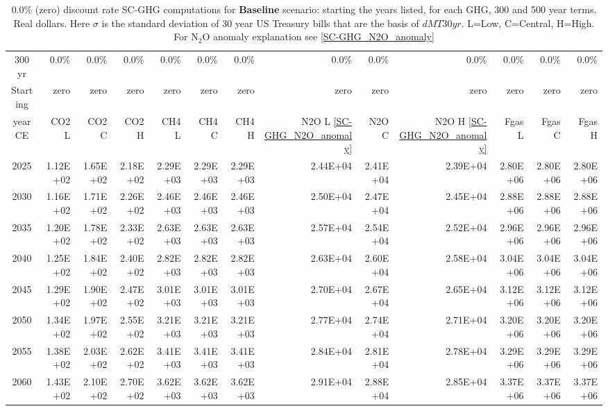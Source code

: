 \documentclass{article}
\begin{document}
\begin{table}
   \caption{0.0\% (zero) discount rate  SC-GHG computations for \textbf{Baseline} scenario: starting the years listed, for each GHG, 300 and 500 year terms. Real dollars. Here $\sigma$ is the standard deviation of 30 year US Treasury bills that are the basis of $dMT30yr$. L=Low, C=Central, H=High. For N$_2$O anomaly explanation see \ref{SC-GHG_N2O_anomaly}} 
\label{PVs_300_yearSCC_B0.0}
\small
\begin{tabular}{crrr|rrr|rrr|rrr}
300 yr   & 0.0\%    & 0.0\%    & 0.0\%    & 0.0\%    & 0.0\%    & 0.0\%    & 0.0\%    & 0.0\%    & 0.0\%    & 0.0\%    & 0.0\%    & 0.0\%    \\
Starting & zero     & zero     & zero     & zero     & zero     & zero     & zero     & zero     & zero     & zero     & zero     & zero     \\
year CE  & CO2 L    & CO2 C    & CO2 H    & CH4 L    & CH4 C    & CH4 H    & N2O L \ref{SC-GHG_N2O_anomaly}     & N2O C      & N2O H \ref{SC-GHG_N2O_anomaly}    & Fgas L   & Fgas C   & Fgas H   \\
2025     & 1.12E+02 & 1.65E+02 & 2.18E+02 & 2.29E+03 & 2.29E+03 & 2.29E+03 & 2.44E+04 & 2.41E+04 & 2.39E+04 & 2.80E+06 & 2.80E+06 & 2.80E+06 \\
2030     & 1.16E+02 & 1.71E+02 & 2.26E+02 & 2.46E+03 & 2.46E+03 & 2.46E+03 & 2.50E+04 & 2.47E+04 & 2.45E+04 & 2.88E+06 & 2.88E+06 & 2.88E+06 \\
2035     & 1.20E+02 & 1.78E+02 & 2.33E+02 & 2.63E+03 & 2.63E+03 & 2.63E+03 & 2.57E+04 & 2.54E+04 & 2.52E+04 & 2.96E+06 & 2.96E+06 & 2.96E+06 \\
2040     & 1.25E+02 & 1.84E+02 & 2.40E+02 & 2.82E+03 & 2.82E+03 & 2.82E+03 & 2.63E+04 & 2.60E+04 & 2.58E+04 & 3.04E+06 & 3.04E+06 & 3.04E+06 \\
2045     & 1.29E+02 & 1.90E+02 & 2.47E+02 & 3.01E+03 & 3.01E+03 & 3.01E+03 & 2.70E+04 & 2.67E+04 & 2.65E+04 & 3.12E+06 & 3.12E+06 & 3.12E+06 \\
2050     & 1.34E+02 & 1.97E+02 & 2.55E+02 & 3.21E+03 & 3.21E+03 & 3.21E+03 & 2.77E+04 & 2.74E+04 & 2.71E+04 & 3.20E+06 & 3.20E+06 & 3.20E+06 \\
2055     & 1.38E+02 & 2.03E+02 & 2.62E+02 & 3.41E+03 & 3.41E+03 & 3.41E+03 & 2.84E+04 & 2.81E+04 & 2.78E+04 & 3.29E+06 & 3.29E+06 & 3.29E+06 \\
2060     & 1.43E+02 & 2.10E+02 & 2.70E+02 & 3.62E+03 & 3.62E+03 & 3.62E+03 & 2.91E+04 & 2.88E+04 & 2.85E+04 & 3.37E+06 & 3.37E+06 & 3.37E+06 \\

\end{tabular}
\end{table}
\end{document}

